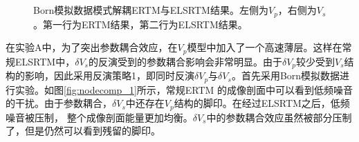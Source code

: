 \begin{figure}[!htb]
   \centering
   \\
   \\
   \caption{Born模拟数据模式解耦ERTM与ELSRTM结果。左侧为$V_p$，右侧为$V_s$。第一行为ERTM结果，第二行为ELSRTM结果。}
   \label{fig:decomp_1}
\end{figure}

在实验A中，为了突出参数耦合效应，在$V_p$模型中加入了一个高速薄层。这样在常规ELSRTM中，$\delta
V_s$的反演受到的参数耦合影响会非常明显。由于$\delta V_p$较少受到$V_s$结构的影响，因此采用反演策略1，即同时反演$\delta
V_p$与$\delta
V_s$。首先采用Born模拟数据进行实验。如图\ref{fig:nodecomp_1}所示，常规ERTM
的成像剖面中可以看到低频噪音的干扰。由于参数耦合，$\delta
V_s$中还存在$V_p$结构的脚印。在经过ELSRTM之后，低频噪音被压制，
整个成像剖面能量更加均衡。$\delta V_s$中的参数耦合效应虽然被部分压制了，但是仍然可以看到残留的脚印。

